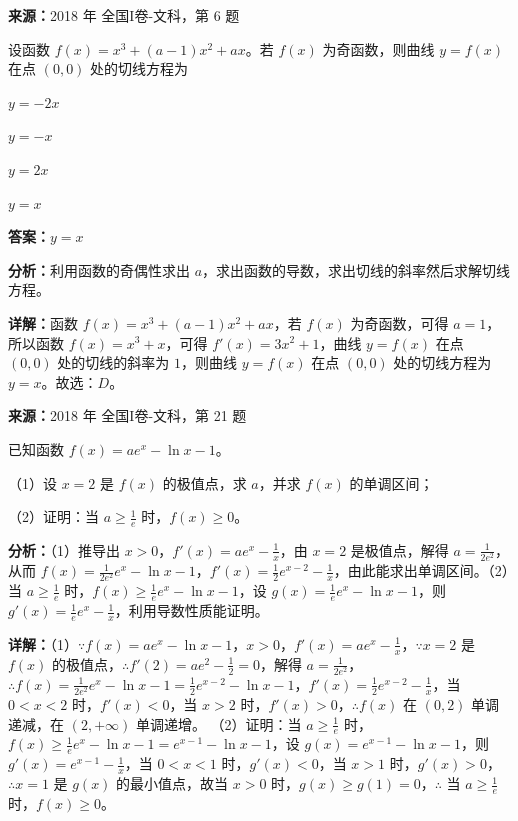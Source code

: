 \begin{question}[points=5]
\textbf{来源：}2018 年 全国I卷-文科，第 6 题\par
设函数 $f(x)=x^3+(a-1)x^2+ax$。若 $f(x)$ 为奇函数，则曲线 $y=f(x)$ 在点 $(0,0)$ 处的切线方程为
\begin{choices}
  \item $y=-2x$
  \item $y=-x$
  \item $y=2x$
  \item $y=x$
\end{choices}
\begin{solution}
\textbf{答案：}$y=x$

\textbf{分析：}利用函数的奇偶性求出 $a$，求出函数的导数，求出切线的斜率然后求解切线方程。

\textbf{详解：}函数 $f(x)=x^3+(a-1)x^2+ax$，若 $f(x)$ 为奇函数，可得 $a=1$，所以函数 $f(x)=x^3+x$，可得 $f'(x)=3x^2+1$，曲线 $y=f(x)$ 在点 $(0,0)$ 处的切线的斜率为 $1$，则曲线 $y=f(x)$ 在点 $(0,0)$ 处的切线方程为 $y=x$。故选：$D$。
\end{solution}
\end{question}

\begin{question}[points=12]
\textbf{来源：}2018 年 全国I卷-文科，第 21 题\par
已知函数 $f(x)=ae^x-\ln x-1$。

（1）设 $x=2$ 是 $f(x)$ 的极值点，求 $a$，并求 $f(x)$ 的单调区间；

（2）证明：当 $a\ge\frac{1}{e}$ 时，$f(x)\ge0$。
\begin{solution}

\textbf{分析：}（1）推导出 $x>0$，$f'(x)=ae^x-\frac{1}{x}$，由 $x=2$ 是极值点，解得 $a=\frac{1}{2e^2}$，从而 $f(x)=\frac{1}{2e^2}e^x-\ln x-1$，$f'(x)=\frac{1}{2}e^{x-2}-\frac{1}{x}$，由此能求出单调区间。（2）当 $a\ge\frac{1}{e}$ 时，$f(x)\ge\frac{1}{e}e^x-\ln x-1$，设 $g(x)=\frac{1}{e}e^x-\ln x-1$，则 $g'(x)=\frac{1}{e}e^x-\frac{1}{x}$，利用导数性质能证明。

\textbf{详解：}（1）$\because f(x)=ae^x-\ln x-1$，$x>0$，$f'(x)=ae^x-\frac{1}{x}$，$\because x=2$ 是 $f(x)$ 的极值点，$\therefore f'(2)=ae^2-\frac{1}{2}=0$，解得 $a=\frac{1}{2e^2}$，$\therefore f(x)=\frac{1}{2e^2}e^x-\ln x-1=\frac{1}{2}e^{x-2}-\ln x-1$，$f'(x)=\frac{1}{2}e^{x-2}-\frac{1}{x}$，当 $0<x<2$ 时，$f'(x)<0$，当 $x>2$ 时，$f'(x)>0$，$\therefore f(x)$ 在 $(0,2)$ 单调递减，在 $(2,+\infty)$ 单调递增。
（2）证明：当 $a\ge\frac{1}{e}$ 时，$f(x)\ge\frac{1}{e}e^x-\ln x-1=e^{x-1}-\ln x-1$，设 $g(x)=e^{x-1}-\ln x-1$，则 $g'(x)=e^{x-1}-\frac{1}{x}$，当 $0<x<1$ 时，$g'(x)<0$，当 $x>1$ 时，$g'(x)>0$，$\therefore x=1$ 是 $g(x)$ 的最小值点，故当 $x>0$ 时，$g(x)\ge g(1)=0$，$\therefore$ 当 $a\ge\frac{1}{e}$ 时，$f(x)\ge0$。
\end{solution}
\end{question}

